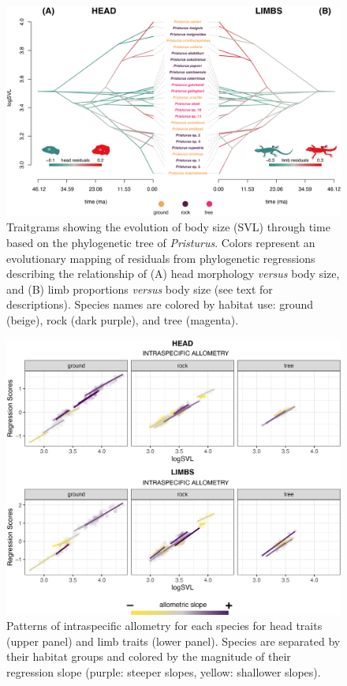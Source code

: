 \documentclass[
  11pt,
]{article}
\begin{document}
\begin{figure}

{\centering \includegraphics[width=1\linewidth]{Figs/figure_3_Pristurus_allometry_traitgram_legends} 

}

\caption{Traitgrams showing the evolution of body size (SVL) through time based on the phylogenetic tree of \textit{Pristurus}. Colors represent an evolutionary mapping of residuals from phylogenetic regressions describing the relationship of (A) head morphology \textit{versus} body size, and (B) limb proportions \textit{versus} body size (see text for descriptions). Species names are colored by habitat use: ground (beige), rock (dark purple), and tree (magenta).}\label{fig:unnamed-chunk-7}
\end{figure}

\newpage

\begin{figure}

{\centering \includegraphics[width=1\linewidth]{Figs/figure_4_intraspecific_allometry} 

}

\caption{Patterns of intraspecific allometry for each species for head traits (upper panel) and limb traits (lower panel). Species are separated by their habitat groups and colored by the magnitude of their regression slope (purple: steeper slopes, yellow: shallower slopes).}\label{fig:unnamed-chunk-8}
\end{figure}
\end{document}
